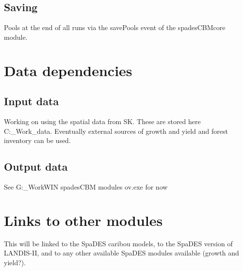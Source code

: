 \documentclass[]{article}
\begin{document}
\subsection{Saving}\label{saving}

Pools at the end of all runs via the savePools event of the
spadesCBMcore module.

\section{Data dependencies}\label{data-dependencies}

\subsection{Input data}\label{input-data}

Working on using the spatial data from SK. These are stored here
C:\Celine\Syndocs\RES\_Work\Work\SpaDES\SK\_data. Eventually external
sources of growth and yield and forest inventory can be used.

\subsection{Output data}\label{output-data}

See G:\RES\_Work\Work\SpaDES\spadesCBM\Prezi WIN spadesCBM modules
ov.exe for now

\section{Links to other modules}\label{links-to-other-modules}

This will be linked to the SpaDES caribou models, to the SpaDES version
of LANDIS-II, and to any other available SpaDES modules available
(growth and yield?).
\end{document}
